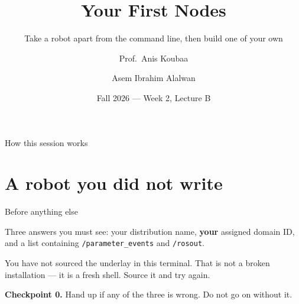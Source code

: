 \documentclass[aspectratio=169]{beamer}
\title[EE 414 --- Week 2B]{Your First Nodes}
\subtitle{Take a robot apart from the command line, then build one of your own}
\author[Koubaa \and Alalwan]{Prof.\ Anis Koubaa \and Asem Ibrahim Alalwan}
\institute[Alfaisal University]{
    EE 414 --- Introduction to Robotics\\
    College of Engineering\\
    Alfaisal University
}
\date{Fall 2026 --- Week 2, Lecture B}
\begin{document}
\begin{frame}[plain]
  \titlepage
\end{frame}

\begin{frame}{How this session works}

  \vspace{0.8em}
  {\scriptsize\tableofcontents[hideallsubsections]}
\end{frame}

\section{A robot you did not write}

\begin{frame}[fragile]{Before anything else}

  \vspace{0.4em}
  \small
  Three answers you must see: your distribution name, \textbf{your} assigned domain ID, and a
  list containing \texttt{/parameter\_events} and \texttt{/rosout}.

  \vspace{0.5em}
  \begin{underhood}
    \footnotesize
    You have not sourced the underlay in this terminal. That is not a broken installation ---
    it is a fresh shell. Source it and try again.
  \end{underhood}

  \vspace{0.4em}
  \centering\footnotesize
  \textbf{Checkpoint 0.} Hand up if any of the three is wrong. Do not go on without it.
\end{frame}
\end{document}
